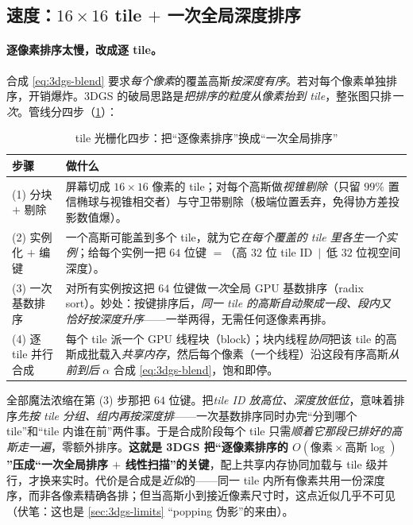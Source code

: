 \subsection{速度：$16\times16$ tile $+$ 一次全局深度排序}

\paragraph{逐像素排序太慢，改成逐 tile。}
合成 \cref{eq:3dgs-blend} 要求\emph{每个像素}的覆盖高斯\emph{按深度有序}。若对每个像素单独排序，开销爆炸。3DGS 的破局思路是\emph{把排序的粒度从像素抬到 tile}，整张图只排\emph{一次}。管线分四步（\cref{tab:3dgs-tile}）：

\begin{table}[H]\centering
\caption{tile 光栅化四步：把“逐像素排序”换成“一次全局排序”}
\label{tab:3dgs-tile}
\small
\begin{tabular}{@{}p{}p{}@{}}
\toprule
步骤 & 做什么 \\
\midrule
(1) 分块 $+$ 剔除 & 屏幕切成 $16\times16$ 像素的 tile；对每个高斯做\emph{视锥剔除}（只留 $99\%$ 置信椭球与视锥相交者）与守卫带剔除（极端位置丢弃，免得协方差投影数值爆）。\\
(2) 实例化 $+$ 编键 & 一个高斯可能盖到多个 tile，就为它\emph{在每个覆盖的 tile 里各生一个实例}；给每个实例一把 $64$ 位键 $=$（高 $32$ 位 tile ID $\,|\,$ 低 $32$ 位视空间深度）。\\
(3) 一次基数排序 & 对所有实例按这把 $64$ 位键做\emph{一次}全局 GPU 基数排序（radix sort）。妙处：按键排序后，\emph{同一 tile 的高斯自动聚成一段、段内又恰好按深度升序}——一举两得，无需任何逐像素再排。\\
(4) 逐 tile 并行合成 & 每个 tile 派一个 GPU 线程块（block）；块内线程\emph{协同}把该 tile 的高斯成批载入\emph{共享内存}，然后每个像素（一个线程）沿这段有序高斯\emph{从前到后} $\alpha$ 合成 \cref{eq:3dgs-blend}，饱和即停。\\
\bottomrule
\end{tabular}
\end{table}

\begin{insight}
全部魔法浓缩在第 (3) 步那把 $64$ 位键。把\emph{tile ID 放高位、深度放低位}，意味着排序\emph{先按 tile 分组、组内再按深度排}——一次基数排序同时办完“分到哪个 tile”和“tile 内谁在前”两件事。于是合成阶段每个 tile 只需\emph{顺着它那段已排好的高斯走一遍}，零额外排序。\textbf{这就是 3DGS 把“逐像素排序的 $O(\text{像素}\times\text{高斯}\log)$”压成“一次全局排序 $+$ 线性扫描”的关键}，配上共享内存协同加载与 tile 级并行，才换来实时。代价是合成是\emph{近似}的——同一 tile 内所有像素共用一份深度序，而非各像素精确各排；但当高斯小到接近像素尺寸时，这点近似几乎不可见（伏笔：这也是 \cref{sec:3dgs-limits} “popping 伪影”的来由）。
\end{insight}

